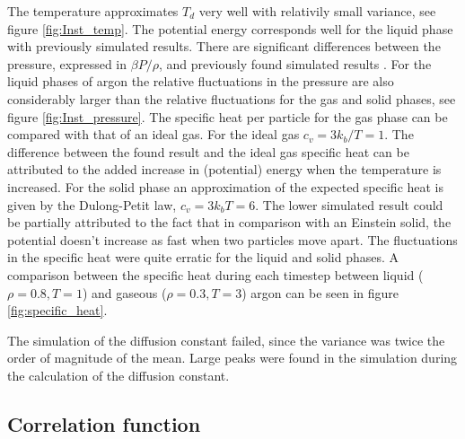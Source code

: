 The temperature approximates $T_d$ very well with relativily small variance, see figure \ref{fig:Inst_temp}. The potential energy corresponds well for the liquid phase with previously simulated results. There are significant differences between the pressure, expressed in $\beta P/\rho$, and previously found simulated results \cite{jos}. For the liquid phases of argon the relative fluctuations in the pressure are also considerably larger than the relative fluctuations for the gas and solid phases, see figure \ref{fig:Inst_pressure}. The specific heat per particle for the gas phase can be compared with that of an ideal gas.  For the ideal gas $c_v = 3k_b/T = 1$. The difference between the found result and the ideal gas specific heat can be attributed to the added increase in (potential) energy when the temperature is increased. For the solid phase an approximation of the expected specific heat is given by the Dulong-Petit law, $c_v = 3k_bT =  6$. The lower simulated result could be partially attributed to the fact that in comparison with an Einstein solid, the potential doesn't increase as fast when two particles move apart. The fluctuations in the specific heat were quite erratic for the liquid and solid phases. A comparison between the specific heat during each timestep between liquid ($\rho = 0.8, T = 1$) and gaseous ($\rho = 0.3, T = 3$) argon can be seen in figure \ref{fig:specific_heat}.

The simulation of the diffusion constant failed, since the variance was twice the order of magnitude of the mean. Large peaks were found in the simulation during the calculation of the diffusion constant. 


\subsection{Correlation function}

